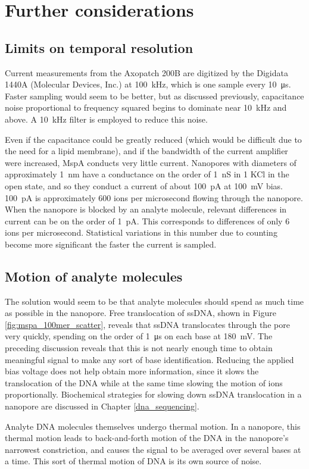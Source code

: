 \section{Further considerations}

\subsection{Limits on temporal resolution}

Current measurements from the Axopatch 200B are digitized by the Digidata 1440A (Molecular Devices, Inc.) at \SI{100}{\kHz}, which is one sample every \SI{10}{\us}.  Faster sampling would seem to be better, but as discussed previously, capacitance noise proportional to frequency squared begins to dominate near \SI{10}{\kHz} and above.  A \SI{10}{\kHz} filter is employed to reduce this noise.

Even if the capacitance could be greatly reduced (which would be difficult due to the need for a lipid membrane), and if the bandwidth of the current amplifier were increased, MspA conducts very little current.  Nanopores with diameters of approximately \SI{1}{\nm} have a conductance on the order of \SI{1}{\nano\siemens} in \SI{1}{\Molar} KCl in the open state, and so they conduct a current of about \SI{100}{\pA} at \SI{100}{\mV} bias.  \SI{100}{\pA} is approximately \num{600} ions per microsecond flowing through the nanopore.  When the nanopore is blocked by an analyte molecule, relevant differences in current can be on the order of \SI{1}{\pA}.  This corresponds to differences of only \num{6} ions per microsecond.  Statistical variations in this number due to counting become more significant the faster the current is sampled.

\subsection{Motion of analyte molecules}

The solution would seem to be that analyte molecules should spend as much time as possible in the nanopore.  Free translocation of ssDNA, shown in Figure \ref{fig:mspa_100mer_scatter}, reveals that ssDNA translocates through the pore very quickly, spending on the order of \SI{1}{\us} on each base at \SI{180}{\mV}.  The preceding discussion reveals that this is not nearly enough time to obtain meaningful signal to make any sort of base identification.  Reducing the applied bias voltage does not help obtain more information, since it slows the translocation of the DNA while at the same time slowing the motion of ions proportionally.  Biochemical strategies for slowing down ssDNA translocation in a nanopore are discussed in Chapter \ref{dna_sequencing}.

Analyte DNA molecules themselves undergo thermal motion.  In a nanopore, this thermal motion leads to back-and-forth motion of the DNA in the nanopore's narrowest constriction, and causes the signal to be averaged over several bases at a time.  This sort of thermal motion of DNA is its own source of noise.